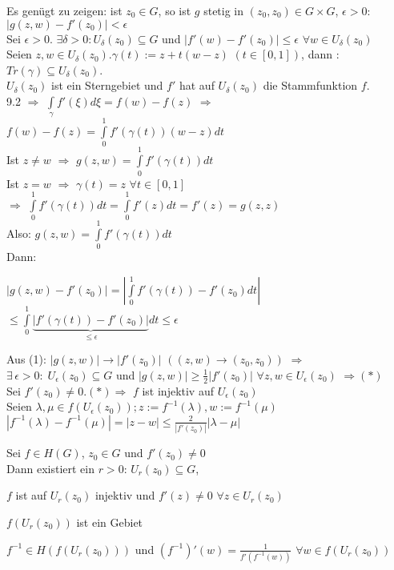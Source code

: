 \documentclass[a4paper,twoside,DIV15,BCOR12mm]{scrbook}
\begin{document}
\begin{beweis}
\begin{liste}
\item Es genügt zu zeigen: ist $z_0 \in G$, so ist $g$ stetig in $(z_0, z_0) \in G
\times G$, $\epsilon > 0$: $|g(z,w)-f'(z_0)| < \epsilon$ \\
Sei $\epsilon > 0$. $\exists \delta > 0: U_\delta(z_0) \subseteq G$ und
$|f'(w)-f'(z_0)| \leq \epsilon$ $\forall w \in U_\delta(z_0)$ \\
Seien $z,w \in U_\delta(z_0). \gamma(t):= z + t(w - z)$ $(t\in [0,1])$, dann : 
\\ $Tr(\gamma) \subseteq U_\delta(z_0)$. \\$U_\delta(z_0)$ ist ein Sterngebiet und
$f'$ hat auf $U_\delta(z_0)$ die Stammfunktion $f$. \\
9.2 $\Rightarrow $ $\int\limits_{\gamma} f'(\xi)d \xi = f(w) - f(z)$
$\Rightarrow$ $ f(w) - f(z) = \int\limits_{0}^1 f'(\gamma(t))(w-z)dt $ \\
Ist $z \neq w$ $\Rightarrow$ $g(z,w) =  \int\limits_{0}^1 f'(\gamma(t))dt $ \\
Ist $z = w$  $\Rightarrow$ $\gamma(t) = z$ $\forall t \in [0,1]$\\ $\Rightarrow$  
$\int\limits_{0}^1 f'(\gamma(t)) dt =  \int\limits_{0}^1 f'(z)dt = f'(z) =
g(z,z)$ \\ Also: $g(z,w) =  \int\limits_{0}^1 f'(\gamma(t))dt $ \\
Dann: \\
\centerline{$|g(z,w)-f'(z_0)| = | \int\limits_{0}^1 f'(\gamma(t))-f'(z_0)dt |$ $\leq 
\int\limits_{0}^1 \underbrace{|f'(\gamma(t))-f'(z_0)|}_{\leq\epsilon}dt \leq \epsilon$}
\item Aus (1): $|g(z,w)| \to |f'(z_0)| $ $ ((z,w) \to (z_0, z_0))$ $\Rightarrow$
$\exists \,\epsilon>0:\;U_\epsilon(z_0) \subseteq G$ und $|g(z,w)| \geq \frac{1}{2}|f'(z_0)|$ $\forall
z, w \in U_\epsilon(z_0)$ $\Rightarrow (*)$\\
Sei $f'(z_0) \neq 0. (*) \Rightarrow$ $f$ ist injektiv auf $U_\epsilon(z_0)$ \\
Seien $\lambda, \mu \in f(U_\epsilon(z_0)); z := f^{-1}(\lambda), w :=
f^{-1}(\mu)$ \\
$|f^{-1}(\lambda) - f^{-1}(\mu) | = |z -w | \leq \frac{2}{|f'(z_0)|}|\lambda - \mu|$
\end{liste}
\end{beweis}
\begin{satz}
Sei $f \in H(G)$, $z_0 \in G$ und $f'(z_0) \neq 0$ \\
Dann existiert ein $r > 0$: $U_r(z_0) \subseteq G$,
\begin{liste}
\item $f$ ist auf $U_r(z_0)$ injektiv und  $f'(z) \neq 0$ $\forall z \in U_r(z_0)$
\item $f(U_r(z_0))$ ist ein Gebiet
\item $f^{-1} \in H(f(U_r(z_0)))$ und $(f^{-1})'(w) = \frac{1}{f'(f^{-1}(w))}$
$\forall w \in f(U_r(z_0))$
\end{liste}
\end{satz}
\end{document}
